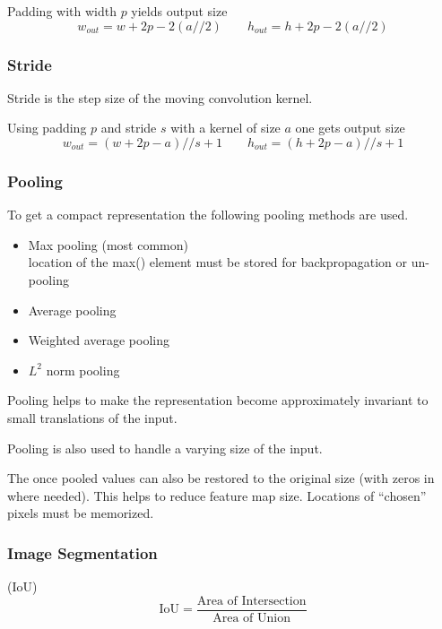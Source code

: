\newpar{}

Padding with width $p$ yields output size
\begin{equation*}
    w_{out}=  w+2p-2(a//2) \qquad
    h_{out}=  h+2p-2(a//2)
\end{equation*}

\subsubsection{Stride}
Stride is the step size of the moving convolution kernel.

Using padding $p$ and stride $s$ with a kernel of size $a$ one gets output size
\begin{equation*}
    w_{out}= (w+2p-a)//s + 1 \qquad
    h_{out}= (h+2p-a)//s + 1
\end{equation*}


\subsubsection{Pooling}
To get a compact representation the following pooling methods are used.
\begin{itemize}
    \item Max pooling (most common)
          \\ location of the max() element must be stored for backpropagation or un-pooling
    \item Average pooling
    \item Weighted average pooling
    \item $L^2$ norm pooling
\end{itemize}

Pooling helps to make the representation become approximately invariant to small translations of the input.

Pooling is also used to handle a varying size of the input.

\newpar{}

The once pooled values can also be restored to the original size (with zeros in where needed). This helps to reduce feature map size. Locations of ``chosen'' pixels must be memorized.

\subsubsection{Image Segmentation}

 (IoU)
\begin{equation*}
    \text{IoU} = \frac{\text{Area of Intersection}}{\text{Area of Union}}
\end{equation*}

